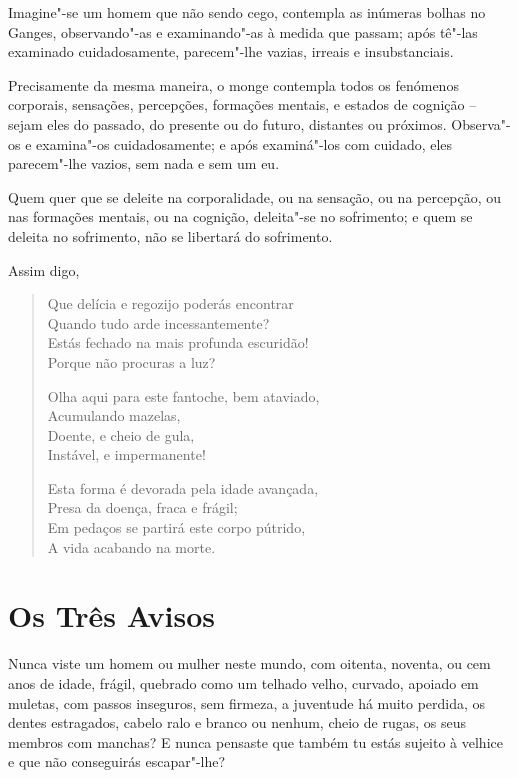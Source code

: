 Imagine"-se um homem que não sendo cego, contempla as inúmeras bolhas no Ganges,
observando"-as e examinando"-as à medida que passam; após tê"-las examinado
cuidadosamente, parecem"-lhe vazias, irreais e insubstanciais.

Precisamente da mesma maneira, o monge contempla todos os fenómenos corporais,
sensações, percepções, formações mentais, e estados de cognição -- sejam eles do
passado, do presente ou do futuro, distantes ou próximos. Observa"-os e
examina"-os cuidadosamente; e após examiná"-los com cuidado, eles parecem"-lhe
vazios, sem nada e sem um eu.


Quem quer que se deleite na corporalidade, ou na sensação, ou na percepção, ou
nas formações mentais, ou na cognição, deleita"-se no sofrimento; e quem se
deleita no sofrimento, não se libertará do sofrimento.


\clearpage

Assim digo,

\begin{verse}
Que delícia e regozijo poderás encontrar\\
Quando tudo arde incessantemente?\\
Estás fechado na mais profunda escuridão!\\
Porque não procuras a luz?

Olha aqui para este fantoche, bem ataviado,\\
Acumulando mazelas,\\
Doente, e cheio de gula,\\
Instável, e impermanente!

Esta forma é devorada pela idade avançada,\\
Presa da doença, fraca e frágil;\\
Em pedaços se partirá este corpo pútrido,\\
A vida acabando na morte.
\end{verse}


\section{Os Três Avisos}

Nunca viste um homem ou mulher neste mundo, com oitenta, noventa, ou cem anos de
idade, frágil, quebrado como um telhado velho, curvado, apoiado em muletas, com
passos inseguros, sem firmeza, a juventude há muito perdida, os dentes
estragados, cabelo ralo e branco ou nenhum, cheio de rugas, os seus membros com
manchas? E nunca pensaste que também tu estás sujeito à velhice e que não
conseguirás escapar"-lhe?

